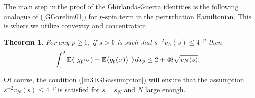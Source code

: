 \documentclass[12pt]{article}
\newcommand{\smsp}{\hspace{0.3mm}}
\newcommand{\e}{\mathbb{E}}
\newcommand{\la}{\langle}
\newcommand{\ra}{\rangle}
\newtheorem{theorem}{Theorem}
\theoremstyle{nonumberplain}
\begin{document}
\medskip
The main step in the proof of the Ghirlanda-Guerra identities is the following analogue of (\ref{GGprelim01}) for $p$-spin term in the perturbation Hamiltonian. This is where we utilize convexity and concentration.
\begin{theorem}\label{ch31L1}
For any $p\geq 1$,  if $s>0$ is such that $s^{-2}v_N(s) \leq 4^{-p}$ then
\begin{equation}
\int_1^2 
\e \bigl\la \bigl|g_p(\sigma) -\e\bigl\la g_p(\sigma)\bigr\ra \bigr|\bigr\ra 
\smsp dx_p
\leq 2 + 48 \sqrt{v_N(s)}.
\label{ch31GGbasic}
\end{equation}
\end{theorem}
Of course, the condition (\ref{ch31GGassumption}) will ensure that the assumption $s^{-2}v_N(s) \leq 4^{-p}$ is satisfied for $s=s_N$ and $N$ large enough. 
\end{document}
